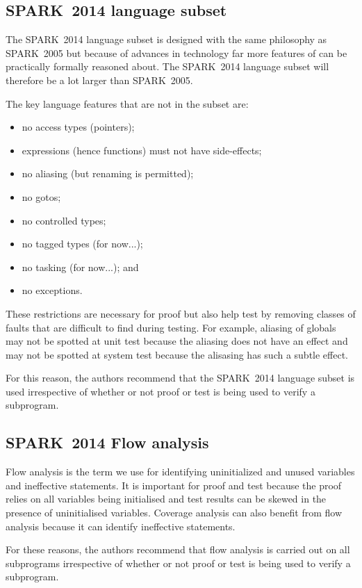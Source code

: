 \documentclass{llncs} \usepackage[utf8]{inputenc} \usepackage{url}
\newcommand{\oldspark}{SPARK~2005\xspace}
\newcommand{\newspark}{SPARK~2014\xspace}
\begin{document}
\subsection{\newspark language subset}
The \newspark language subset is designed with the same philosophy as
\oldspark but because of advances in technology far more features of
\ada can be practically formally reasoned about. The \newspark
language subset will therefore be a lot larger than \oldspark.

The key language features that are not in the subset are:

\begin{itemize}
   \item no access types (pointers);
   \item expressions (hence functions) must not have side-effects;
   \item no aliasing (but renaming is permitted);
   \item no gotos;
   \item no controlled types;
   \item no tagged types (for now...);
   \item no tasking (for now...); and
   \item no exceptions.
\end{itemize}

These restrictions are necessary for proof but also help test by
removing classes of faults that are difficult to find during
testing. For example, aliasing of globals may not be spotted at unit
test because the aliasing does not have an effect and may not be
spotted at system test because the alisasing has such a subtle effect.

For this reason, the authors recommend that the \newspark language
subset is used irrespective of whether or not proof or test is being
used to verify a subprogram.

\subsection{\newspark Flow analysis}
Flow analysis is the term we use for identifying uninitialized and
unused variables and ineffective statements.  It is important for
proof and test because the proof relies on all variables being
initialised and test results can be skewed in the presence of
uninitialised variables. Coverage analysis can also benefit from flow
analysis because it can identify ineffective statements.

For these reasons, the authors recommend that flow analysis is carried
out on all subprograms irrespective of whether or not proof or test is
being used to verify a subprogram.
\end{document}
